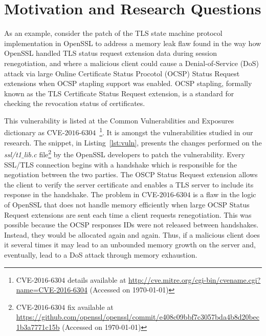 \documentclass[smallextended]{svjour3}       %
\makeatletter
\newcommand\footnoteref[1]{\protected@xdef\@thefnmark{\ref{#1}}\@footnotemark}
\makeatother
\begin{document}
\section{Motivation and Research Questions}\label{sec:motivation}

As an example, consider the patch of the TLS state machine protocol 
implementation in OpenSSL\footnoteref{openssl} to address a memory 
leak flaw found in the way how OpenSSL handled TLS status request 
extension data during session renegotiation, and where a malicious 
client could cause a Denial-of-Service (DoS) attack via large Online 
Certificate Status Procotol (OCSP) Status Request extensions when 
OCSP stapling support was enabled. OCSP stapling, formally known 
as the TLS Certificate Status Request extension, is a standard for 
checking the revocation status of certificates. 

This vulnerability is listed at the Common Vulnerabilities and 
Exposures dictionary as CVE-$2016$-$6304$~\footnote{CVE-$2016$-$6304$
details available at 
\url{http://cve.mitre.org/cgi-bin/cvename.cgi?name=CVE-2016-6304}
(Accessed on \today{})}. It is amongst the vulnerabilities studied 
in our research. The snippet, in Listing~\ref{lst:vuln}, presents 
the changes performed on the
\emph{ssl/t1$\_$lib.c} file\footnote{CVE-$2016$-$6304$ fix available 
 at
\url{https://github.com/openssl/openssl/commit/e408c09bbf7c3057bda4b8d20bec1b3a7771c15b}
(Accessed on \today{})} by the OpenSSL developers to patch the 
vulnerability. Every SSL/TLS connection begins with a handshake 
which is responsible for the negotiation between the two parties. 
The OSCP Status Request extension allows the client to verify the 
server certificate and enables a TLS server to include its response 
in the handshake. The problem in CVE-$2016$-$6304$ is a flaw in the 
logic of OpenSSL that does not handle memory efficiently when large 
OCSP Status Request extensions are sent each time a client requests 
renegotiation. This was possible because the OCSP responses IDs 
were not released between handshakes. Instead, they would be 
allocated again and again. Thus, if a malicious client does it 
several times it may lead to an unbounded memory growth on the 
server and, eventually, lead to a DoS attack through memory 
exhaustion. 
\end{document}
